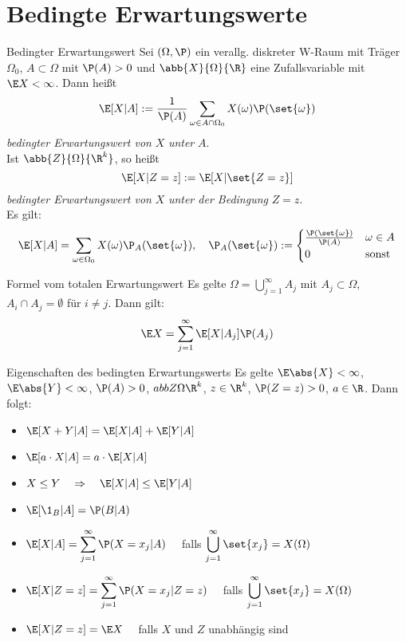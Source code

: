 \section*{Bedingte Erwartungswerte}

\begin{karte}{Bedingter Erwartungswert}
	Sei $(\Omega,\P)$ ein verallg. diskreter W-Raum mit Träger $\Omega_0$, $A \subset \Omega$ mit
	 $\P(A) > 0$ und $\abb{X}{\Omega}{\R}$ eine Zufallsvariable mit $\E X < \infty$. Dann heißt
	$$\E[X|A]:= \frac{1}{\P(A)}\sum_{\omega \in A \cap \Omega_0} X(\omega)\P(\set{\omega})$$
	\textit{bedingter Erwartungswert von }$X$\textit{ unter }$A$. \\
	Ist $\abb{Z}{\Omega}{\R^k}$, so heißt 
	$$\E[X|Z=z] := \E[X|\set{Z=z}]$$
	\textit{bedingter Erwartungswert von }$X$\textit{ unter der Bedingung }$Z=z$. \\
	Es gilt:
	$$\E[X|A]=\sum_{\omega \in \Omega_0} X(\omega) \P_A(\set{\omega}), \quad \P_A(\set{\omega}):= \begin{cases}
	\frac{\P(\set{\omega})}{\P(A)} & \omega \in A \\
	0 & \text{sonst}
	\end{cases}$$
\end{karte}

\begin{karte}{Formel vom totalen Erwartungswert}
	Es gelte $\displaystyle \Omega = \bigcup_{j=1}^{\infty} A_j$ mit $A_j \subset \Omega$, $A_i \cap A_j = \emptyset$
	 für $i \neq j$. Dann gilt:
	$$\E X = \sum_{j=1}^{\infty} \E[X|A_j]\P(A_j)$$
\end{karte}

\begin{karte}{Eigenschaften des bedingten Erwartungswerts}
	Es gelte $\E \abs{X} < \infty$, $\E \abs{Y} < \infty$, $\P(A) > 0$, $abb{Z}{\Omega}{\R^k}$, $z \in \R^k$, 
	$\P(Z=z) > 0$, $a \in \R$. Dann folgt:
	\begin{itemize}
		\item $\E[X+Y|A]=\E[X|A]+ \E[Y|A]$
		\item $\E[a \cdot X|A] = a \cdot \E[X|A]$
		\item $X \leq Y \quad \Rightarrow \quad \E[X|A] \leq \E[Y|A]$
		\item $\E[\1_B|A]= \P(B|A)$
		\item $\displaystyle \E[X|A]= \sum_{j=1}^{\infty} \P(X=x_j|A) \quad$ 
		falls $\displaystyle \bigcup_{j=1}^{\infty} \set{x_j} = X(\Omega)$
		\item $\displaystyle \E[X|Z=z]= \sum_{j=1}^{\infty} \P(X=x_j|Z=z) \quad$ 
		falls $\displaystyle \bigcup_{j=1}^{\infty} \set{x_j} = X(\Omega)$
		\item $\E[X|Z=z]=\E X \quad$ falls $X$ und $Z$ unabhängig sind
	\end{itemize}
\end{karte}

